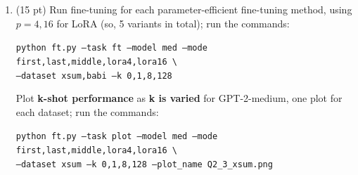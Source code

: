 \documentclass[12pt]{article}
\begin{document}
\begin{enumerate}
        \item (15 pt) Run fine-tuning for each parameter-efficient fine-tuning method, using $p=4,16$ for LoRA (so, 5 variants in total); run the commands:

            {\small \texttt{python ft.py --task ft --model med --mode first,last,middle,lora4,lora16 \textbackslash \\
        \phantom{asdf}--dataset xsum,babi --k 0,1,8,128}}

        Plot \textbf{k-shot performance} as \textbf{k is varied} for GPT-2-medium, one plot for each dataset; run the commands:

            {\small \texttt{python ft.py --task plot --model med --mode first,last,middle,lora4,lora16 \textbackslash \\
        \phantom{asdf}--dataset xsum --k 0,1,8,128 --plot\_name Q2\_3\_xsum.png}}


\end{enumerate}
\end{document}
